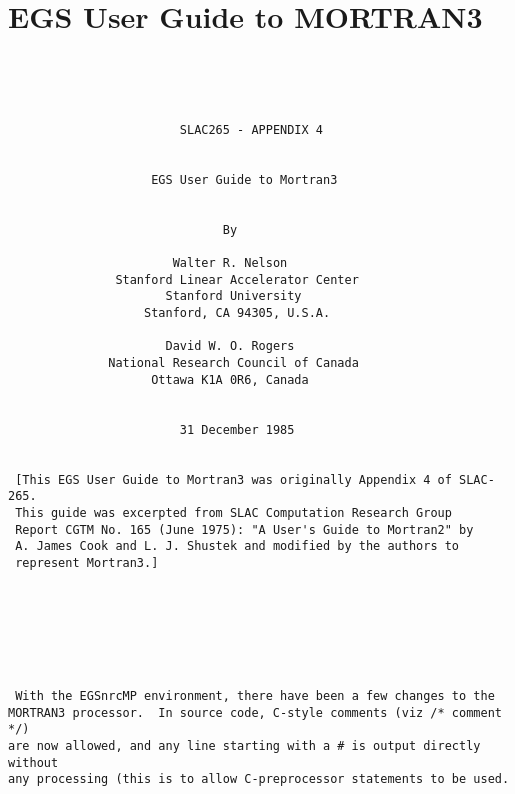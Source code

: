\section{EGS User Guide to MORTRAN3}
\label{UGM3}
\begin{verbatim}




                        SLAC265 - APPENDIX 4


                    EGS User Guide to Mortran3


                              By

                       Walter R. Nelson
               Stanford Linear Accelerator Center
                      Stanford University
                   Stanford, CA 94305, U.S.A.

                      David W. O. Rogers
              National Research Council of Canada
                    Ottawa K1A 0R6, Canada


                        31 December 1985


 [This EGS User Guide to Mortran3 was originally Appendix 4 of SLAC-265.
 This guide was excerpted from SLAC Computation Research Group
 Report CGTM No. 165 (June 1975): "A User's Guide to Mortran2" by
 A. James Cook and L. J. Shustek and modified by the authors to
 represent Mortran3.]







 With the EGSnrcMP environment, there have been a few changes to the
MORTRAN3 processor.  In source code, C-style comments (viz /* comment */)
are now allowed, and any line starting with a # is output directly without
any processing (this is to allow C-preprocessor statements to be used.
\end{verbatim}
